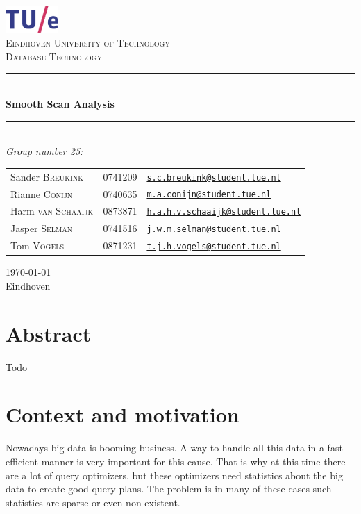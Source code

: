 \documentclass[a4paper,11pt,twoside]{article}
\author{
	Sander Breukink (0741209) - \texttt{s.c.breukink@student.tue.nl}\\
	Rianne Conijn (0740635) - \texttt{m.a.conijn@student.tue.nl}\\
	Harm van Schaaijk (0873871) - \texttt{h.a.h.v.schaaijk@student.tue.nl}\\
	Jasper Selman (0741516) - \texttt{j.w.m.selman@student.tue.nl}\\
	Tom Vogels (0871231) - \texttt{t.j.h.vogels@student.tue.nl}
}
\date{\today}
\newcommand{\HRule}{\rule{\linewidth}{0.5mm}}
\newcommand{\uni}{Eindhoven University of Technology}
\newcommand{\vak}{Database Technology}
\newcommand{\essaytitle}{Smooth Scan Analysis}
\newcommand{\stad}{Eindhoven}
\begin{document}
	\begin{center} \thispagestyle{empty}

		\includegraphics[width=0.15\textwidth]{images/tuelogo}\\[1cm]

		\textsc{\LARGE \uni}\\[1.6cm]


        \textsc{\LARGE \vak}\\[0.5cm]

\HRule \\[0.4cm]
{ \huge \bfseries \essaytitle}\\[0.4cm]

\HRule \\[1.5cm]

	\emph{Group number 25:}\\
    \begin{tabular}{l l l}
	Sander \textsc{Breukink} & 0741209 & \href{mailto:s.c.breukink@student.tue.nl}{\texttt{s.c.breukink@student.tue.nl}}\\
	Rianne \textsc{Conijn} & 0740635 & \href{mailto:m.a.conijn@student.tue.nl}{\texttt{m.a.conijn@student.tue.nl}}\\
	Harm \textsc{van Schaaijk} & 0873871 & \href{mailto:h.a.h.v.schaaijk@student.tue.nl}{\texttt{h.a.h.v.schaaijk@student.tue.nl}}\\
	Jasper \textsc{Selman} & 0741516 & \href{mailto:j.w.m.selman@student.tue.nl}{\texttt{j.w.m.selman@student.tue.nl}}\\
	Tom \textsc{Vogels} & 0871231 & \href{mailto:t.j.h.vogels@student.tue.nl}{\texttt{t.j.h.vogels@student.tue.nl}}
    \end{tabular}
		\vfill

{\large \today} \\
\stad

	\end{center}

    \newpage
\section{Abstract}
Todo
\section{Context and motivation}
Nowadays big data is booming business. A way to handle all this data in a fast efficient manner is very important for this cause. That is why at this time there are a lot of query optimizers, but these optimizers need statistics about the big data to create good query plans. The problem is in many of these cases such statistics are sparse or even non-existent.
\end{document}
